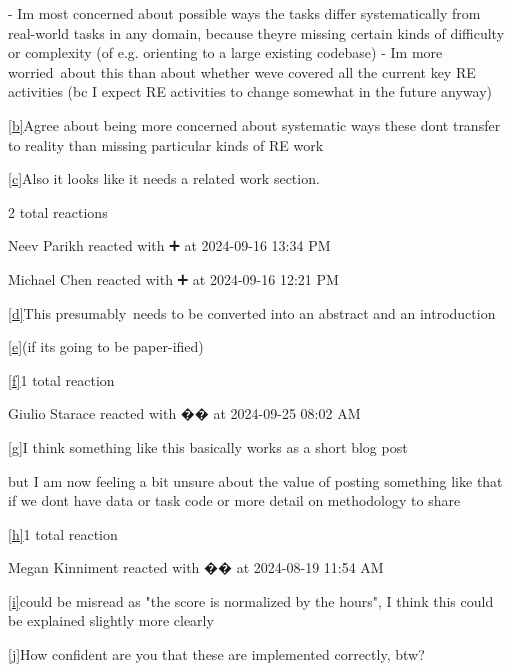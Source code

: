 \documentclass[
]{article}
\begin{document}
{- I\textquotesingle m most concerned about possible ways the tasks
differ systematically from real-world tasks in any domain, because
they\textquotesingle re missing certain kinds of difficulty or
complexity (of e.g. orienting to a large existing codebase) -
I\textquotesingle m more worried~about this than about whether
we\textquotesingle ve covered all the current key RE activities (bc I
expect RE activities to change somewhat in the future anyway)}

\label{cmnt2}\hyperref[cmnt_ref2]{{[}b{]}}{Agree about
being more concerned about systematic ways these don\textquotesingle t
transfer to reality than missing particular kinds of RE work}

\label{cmnt3}\hyperref[cmnt_ref3]{{[}c{]}}{Also it looks
like it needs a related work section.}

{2 total reactions}

{Neev Parikh reacted with ➕ at 2024-09-16 13:34 PM}

{Michael Chen reacted with ➕ at 2024-09-16 12:21 PM}

\label{cmnt4}\hyperref[cmnt_ref4]{{[}d{]}}{This
presumably~needs to be converted into an abstract and an introduction}

\label{cmnt5}\hyperref[cmnt_ref5]{{[}e{]}}{(if
it\textquotesingle s going to be paper-ified)}

\label{cmnt6}\hyperref[cmnt_ref6]{{[}f{]}}{1 total
reaction}

{Giulio Starace reacted with �� at 2024-09-25 08:02 AM}

\label{cmnt7}\hyperref[cmnt_ref7]{{[}g{]}}{I think
something like this basically works as a short blog post}

{but I am now feeling a bit unsure about the value of posting something
like that if we don\textquotesingle t have data or task code or more
detail on methodology to share}

\label{cmnt8}\hyperref[cmnt_ref8]{{[}h{]}}{1 total
reaction}

{Megan Kinniment reacted with �� at 2024-08-19 11:54 AM}

\label{cmnt9}\hyperref[cmnt_ref9]{{[}i{]}}{could be
misread as "the score is normalized by the hours", I think this could be
explained slightly more clearly}

\label{cmnt10}\hyperref[cmnt_ref10]{{[}j{]}}{How
confident are you that these are implemented correctly, btw?}
\end{document}
